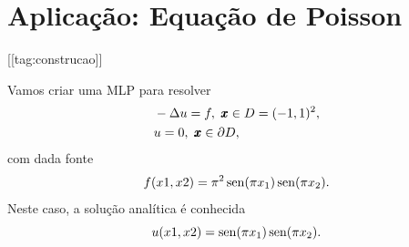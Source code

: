 \section{Aplicação: Equação de Poisson}\label{cap_mlp_sec_eqpoisson}
[[tag:construcao]]

Vamos criar uma MLP para resolver
\begin{subequations}\label{cap_mlp_sec_eqlaplace:eq:probLaplace}
  \begin{align}
    &-\Delta u = f, ~\pmb{x}\in D = (-1, 1)^2,\\
    &u = 0, ~\pmb{x}\in\partial D,
  \end{align}
\end{subequations}
com dada fonte
\begin{equation}
  f(x1, x2) = \pi^2\operatorname{sen}(\pi x_1)\operatorname{sen}(\pi x_2).
\end{equation}
Neste caso, a solução analítica é conhecida
\begin{equation}
  u(x1, x2) = \operatorname{sen}(\pi x_1)\operatorname{sen}(\pi x_2). 
\end{equation}


